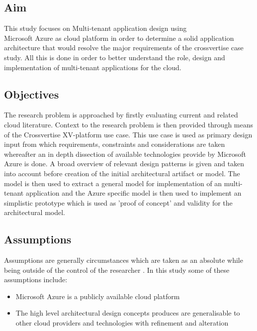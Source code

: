 \subsection{Aim}
This study focuses on Multi-tenant application design using \\ Microsoft Azure as cloud platform in order to determine a solid application architecture that would resolve the major requirements of the crossvertise case study. All this is done in order to better understand the role, design and implementation of multi-tenant applications for the cloud.

\subsection{Objectives}
The research problem is approached by firstly evaluating current and related cloud literature. Context to the research problem is then provided through means of the Crossvertise XV-platform use case. This use case is used as primary design input from which requirements, constraints and considerations are taken whereafter an in depth dissection of available technologies provide by Microsoft Azure is done. A broad overview of relevant design patterns is given and taken into account before creation of the initial architectural artifact or model. The model is then used to extract a general model for implementation of an multi-tenant application and the Azure specific model is then used to implement an simplistic prototype which is used as 'proof of concept' and validity for the architectural model.

\subsection{Assumptions}
Assumptions are generally circumstances which are taken as an absolute while being outside of the control of the researcher \cite{simon2010dissertation}. In this study some of these assumptions include:
\begin{itemize}
\item Microsoft Azure is a publicly available cloud platform
\item The high level architectural design concepts produces are generalisable to other cloud providers and technologies with refinement and alteration
\end{itemize}

